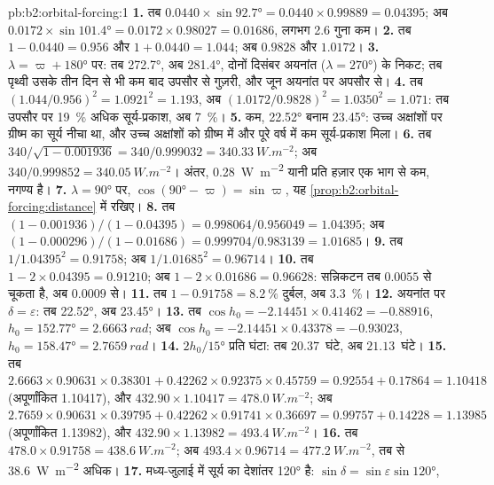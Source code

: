 \begin{solution}{pb:b2:orbital-forcing:1}
\textbf{1.} तब $0.0440 \times \sin\ang{92.7} = 0.0440 \times 0.99889 = 0.04395$; अब $0.0172 \times
\sin\ang{101.4} = 0.0172 \times 0.98027 = 0.01686$, लगभग 2.6 गुना कम।
\textbf{2.} तब $1 - 0.0440 = 0.956$ और $1 + 0.0440 = 1.044$; अब $0.9828$ और $1.0172$।
\textbf{3.} $\lambda = \varpi + \ang{180}$ पर: तब \ang{272.7}, अब \ang{281.4}, दोनों
दिसंबर अयनांत ($\lambda = \ang{270}$) के निकट; तब पृथ्वी उसके तीन दिन से भी कम बाद उपसौर से
गुज़री, और जून अयनांत पर अपसौर से।
\textbf{4.} तब $(1.044/0.956)^2 = 1.0921^2 = 1.193$, अब $(1.0172/0.9828)^2 = 1.0350^2 = 1.071$:
तब उपसौर पर \qty{19}{\percent} अधिक सूर्य-प्रकाश, अब \qty{7}{\percent}।
\textbf{5.} कम, \ang{22.52} बनाम \ang{23.45}: उच्च अक्षांशों पर ग्रीष्म का सूर्य नीचा था,
और उच्च अक्षांशों को ग्रीष्म में और पूरे वर्ष में कम सूर्य-प्रकाश मिला।
\textbf{6.} तब $340/\sqrt{1 - 0.001936} = 340/0.999032 = \qty{340.33}{W.m^{-2}}$; अब $340/0.999852
= \qty{340.05}{W.m^{-2}}$। अंतर, \qty{0.28}{W.m^{-2}} यानी प्रति हज़ार एक भाग से कम,
नगण्य है।
\textbf{7.} $\lambda = \ang{90}$ पर, $\cos(\ang{90} - \varpi) = \sin\varpi$, यह
\cref{prop:b2:orbital-forcing:distance} में रखिए।
\textbf{8.} तब $(1 - 0.001936)/(1 - 0.04395) = 0.998064/0.956049 = 1.04395$; अब $(1 -
0.000296)/(1 - 0.01686) = 0.999704/0.983139 = 1.01685$।
\textbf{9.} तब $1/1.04395^2 = 0.91758$; अब $1/1.01685^2 = 0.96714$।
\textbf{10.} तब $1 - 2 \times 0.04395 = 0.91210$; अब $1 - 2 \times 0.01686 = 0.96628$:
सन्निकटन तब $0.0055$ से चूकता है, अब $0.0009$ से।
\textbf{11.} तब $1 - 0.91758 = \qty{8.2}{\percent}$ दुर्बल, अब \qty{3.3}{\percent}।
\textbf{12.} अयनांत पर $\delta = \varepsilon$: तब \ang{22.52}, अब \ang{23.45}।
\textbf{13.} तब $\cos h_0 = -2.14451 \times 0.41462 = -0.88916$, $h_0 = \ang{152.77} =
\qty{2.6663}{rad}$; अब $\cos h_0 = -2.14451 \times 0.43378 = -0.93023$, $h_0 = \ang{158.47} =
\qty{2.7659}{rad}$।
\textbf{14.} $2h_0/\ang{15}$ प्रति घंटा: तब $20.37$~घंटे, अब $21.13$~घंटे।
\textbf{15.} तब $2.6663 \times 0.90631 \times 0.38301 + 0.42262 \times 0.92375 \times 0.45759 =
0.92554 + 0.17864 = 1.10418$ (अपूर्णांकित \num{1.10417}), और $432.90 \times 1.10417 =
\qty{478.0}{W.m^{-2}}$; अब $2.7659 \times 0.90631 \times 0.39795 + 0.42262 \times 0.91741 \times
0.36697 = 0.99757 + 0.14228 = 1.13985$ (अपूर्णांकित \num{1.13982}), और $432.90 \times 1.13982 = \qty{493.4}{W.m^{-2}}$।
\textbf{16.} तब $478.0 \times 0.91758 = \qty{438.6}{W.m^{-2}}$; अब $493.4 \times 0.96714 =
\qty{477.2}{W.m^{-2}}$, तब से \qty{38.6}{W.m^{-2}} अधिक।
\textbf{17.} मध्य-जुलाई में सूर्य का देशांतर \ang{120} है: $\sin\delta = \sin\varepsilon\sin\ang{120}$,

\end{solution}
